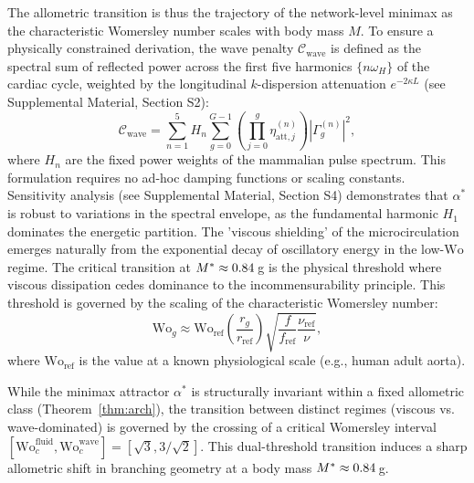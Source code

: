 The allometric transition is thus the trajectory of the network-level minimax as
the characteristic Womersley number scales with body mass $M$. To ensure a
physically constrained derivation, the wave penalty
$\mathcal{C}_{\mathrm{wave}}$ is defined as the spectral sum of reflected power
across the first five harmonics $\{n\omega_H\}$ of the cardiac cycle, weighted
by the longitudinal $k$-dispersion attenuation $e^{-2 \kappa L}$ (see
Supplemental Material, Section S2):
\begin{equation}
    \mathcal{C}_{\mathrm{wave}} = \sum_{n=1}^5 H_n \sum_{g=0}^{G-1} \left( \prod_{j=0}^{g} \eta_{\mathrm{att}, j}^{(n)} \right) |\Gamma_g^{(n)}|^2,
\end{equation}
where $H_n$ are the fixed power weights of the mammalian pulse spectrum. This
formulation requires no ad-hoc damping functions or scaling constants.
Sensitivity analysis (see Supplemental Material, Section S4) demonstrates that
$\alpha^*$ is robust to variations in the spectral envelope, as the fundamental
harmonic $H_1$ dominates the energetic partition. The 'viscous shielding' of the
microcirculation emerges naturally from the exponential decay of oscillatory
energy in the low-$\mathrm{Wo}$ regime. The critical transition at $M^* \approx
0.84\,$g is the physical threshold where viscous dissipation cedes
dominance to the incommensurability principle. This threshold is governed by the
scaling of the characteristic Womersley number:
\begin{equation}
    \mathrm{Wo}_g \approx \mathrm{Wo}_{\mathrm{ref}} \left( \frac{r_g}{r_{\mathrm{ref}}} \right) \sqrt{\frac{f}{f_{\mathrm{ref}}} \frac{\nu_{\mathrm{ref}}}{\nu}},
    \label{eq:wo_scaling}
\end{equation}
where $\mathrm{Wo}_{\mathrm{ref}}$ is the value at a known physiological scale
(e.g., human adult aorta).

\begin{theorem}
\label{thm:cross_transition}
While the minimax attractor $\alpha^*$ is structurally invariant within a fixed
allometric class (Theorem~\ref{thm:arch}), the transition between distinct
regimes (viscous vs. wave-dominated) is governed by the crossing of a critical
Womersley interval $[\mathrm{Wo}_c^{\mathrm{fluid}},
\mathrm{Wo}_c^{\mathrm{wave}}] = [\sqrt{3}, 3/\sqrt{2}]$. This dual-threshold
transition induces a sharp allometric shift in branching geometry at a body mass
$M^* \approx 0.84\,$g.
\end{theorem}


